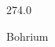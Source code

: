 \documentclass[12pt]{article}
\begin{document}
\hfill{}
\vfill
\begin{center}
  {\fontsize{50}{60}
  }

  274.0

Bohrium
\end{center}
\vfill
\end{document}
